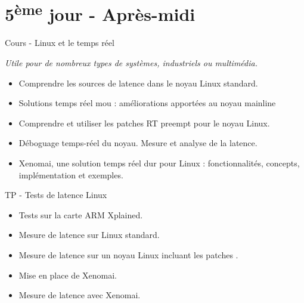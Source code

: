 \documentclass[a4paper,12pt,obeyspaces,spaces,hyphens]{article}
\begin{document}
\section{5\textsuperscript{ème} jour - Après-midi}

\feagendaonecolumn
{Cours - Linux et le temps réel}
{
  {\em Utile pour de nombreux types de systèmes, industriels ou multimédia.}
  \begin{itemize}
  \item Comprendre les sources de latence dans le noyau Linux standard.
  \item Solutions temps réel mou : améliorations apportées au noyau mainline
  \item Comprendre et utiliser les patches RT preempt pour le noyau Linux.
  \item Déboguage temps-réel du noyau. Mesure et analyse de la latence.
  \item Xenomai, une solution temps réel dur pour Linux : fonctionnalités, concepts,
	implémentation et exemples.
  \end{itemize}
}

\feagendaonecolumn
{TP - Tests de latence Linux}
{
  \begin{itemize}
  \item Tests sur la carte ARM Xplained.
  \item Mesure de latence sur Linux standard.
  \item Mesure de latence sur un noyau Linux
	incluant les patches .
  \item Mise en place de Xenomai.
  \item Mesure de latence avec Xenomai.
  \end{itemize}
}
\end{document}
